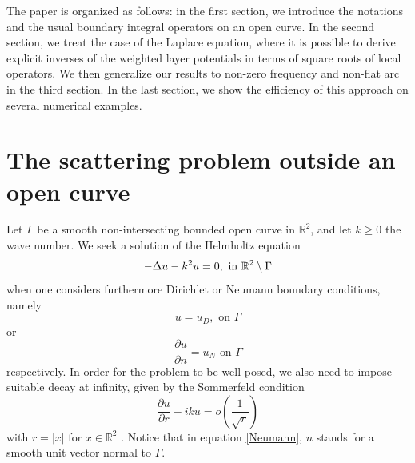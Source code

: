 \documentclass[a4paper]{article}
\begin{document}
The paper is organized as follows: in the first section, we introduce the notations and the usual boundary integral operators on an open curve. 
In the second section, we treat the case of the Laplace equation, where it is possible to derive explicit inverses of the weighted layer potentials 
in terms of square roots of local operators. We then generalize our results to non-zero frequency and non-flat arc in the third section. In the last 
section, we show the efficiency of this approach on several numerical examples. 


\section{The scattering problem outside an open curve}

Let $\Gamma$ be a smooth non-intersecting bounded open curve in $\mathbb{R}^2$, and let $k \geq 0$ the wave number. We seek a solution 
of the Helmholtz equation
\begin{equation}
	-\Delta u - k^2 u = 0,  \text{ in } \mathbb{R}^2 \setminus \Gamma
	\label{Helmholtz}
\end{equation}
when one considers furthermore Dirichlet or Neumann boundary conditions, namely
\begin{equation}
	u = u_D, \text{ on } \Gamma
\label{Dirichlet}
\end{equation}
or
\begin{equation} 
	\dfrac{\partial u}{\partial n} = u_N  \text{ on } \Gamma 
\label{Neumann}
\end{equation}
respectively. In order for the problem to be well posed, we also need to impose suitable decay at infinity, given by the Sommerfeld condition
\begin{equation}
	\dfrac{\partial u}{\partial r} - iku = o\left(\frac{1}{\sqrt{r}}\right)
\label{Sommerfeld}
\end{equation}
with $r=|x|$ for $x\in \mathbb{R}^2$ .
Notice that in equation \eqref{Neumann}, $n$ stands for a smooth unit vector normal to $\Gamma$. 
\end{document}
